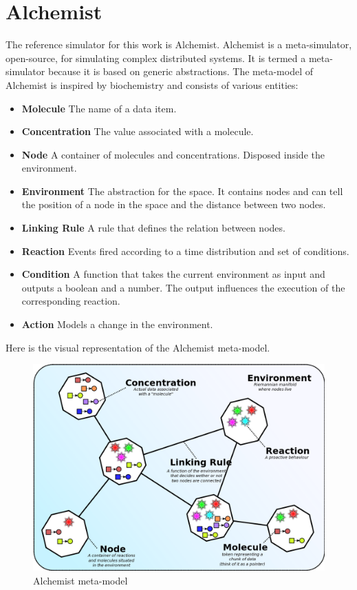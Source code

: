 \documentclass[12pt,a4paper,openright,twoside]{book}
\begin{document}
\section{Alchemist}

The reference simulator for this work is Alchemist. \cite{Pianini_2013}
Alchemist is a meta-simulator, open-source, for simulating complex distributed systems. It is termed a meta-simulator because it is based on generic abstractions. 
The meta-model of Alchemist is inspired by biochemistry and consists of various entities:
\begin{itemize}
  \item \textbf{Molecule} The name of a data item.
  \item \textbf{Concentration} The value associated with a molecule.
  \item \textbf{Node} A container of molecules and concentrations. Disposed inside the environment.
  \item \textbf{Environment} The abstraction for the space. It contains nodes and can tell the position of a node in the space and the distance between two nodes.
  \item \textbf{Linking Rule} A rule that defines the relation between nodes.
  \item \textbf{Reaction} Events fired according to a time distribution and set of conditions.
  \item \textbf{Condition} A function that takes the current environment as input and outputs a boolean and a number. The output influences the execution of the corresponding reaction.
  \item \textbf{Action} Models a change in the environment.
\end{itemize}

Here is the visual representation of the Alchemist meta-model.

\begin{figure}[H]
  \centering
  \includegraphics[width=\textwidth]{figures/alchemist-model.png}
  \caption{Alchemist meta-model}
\end{figure}
\end{document}
